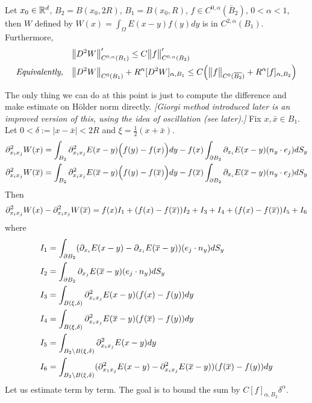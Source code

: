 \documentclass[12pt,a4paper]{article}
\newenvironment{proof}
{\begin{changemargin}{0.5cm}{0.5cm} 
	}%
	{\end{changemargin}
}
\newenvironment{p}
{\begin{proof} 
	}%
	{\end{proof}
}
\begin{document}
 Let $x_0\in \mathbb{R}^d$, $B_2 = B(x_0, 2R)$, $B_1=B(x_0, R)$, $f\in C^{0, \alpha}(\bar{B}_2)$, $0<\alpha<1$, then $W$ defined by $W(x) = \int_{\Omega} E(x-y) f(y)dy$ is in $C^{2,\alpha}(B_1)$. Furthermore,
\begin{align*}
&\bigl\lVert D^2 W\bigr\rVert_{C^{0, \alpha}(B_1)}' \leq C \bigl\lVert f\bigr\rVert_{C^{0, \alpha}(B_2)}' \\
\textit{Equivalently,} \quad &\bigl\lVert D^2 W\bigr\rVert_{C^0(B_1)} +R^{\alpha}[D^2 W]_{\alpha, B_1} \leq C \Big( \bigl\lVert f\bigr\rVert_{C^0(\overline{B_2})} + R^{\alpha}[f]_{\alpha, B_2} \Big)
\end{align*}
\begin{p}
\pf The only thing we can do at this point is just to compute the difference and make estimate on H\"older norm directly. \emph{[Giorgi method introduced later is an improved version of this, using the idea of oscillation (see later).]}
Fix $x, \bar{x} \in B_1$. Let $0<\delta := |x-\bar{x}|< 2R$ and $\xi = \frac{1}{2}(x+\bar{x})$.
\begin{align*}
&\partial^2_{x_i x_j} W(x) = \int_{B_2} \partial_{x_i x_j}^2 E(x-y) \Big(f(y)- f(x)\Big) dy - f(x) \int_{\partial B_2} \partial_{x_i} E(x-y) (n_y \cdot e_j) dS_y \\
&\partial_{x_i x_j}^2 W(\overline{x}) = \int_{B_2} \partial_{x_i x_j}^2 E(\overline{x}-y) \Big(f(y)- f(\overline{x})\Big) dy - f(\overline{x}) \int_{\partial B_2} \partial_{x_i} E(\overline{x}-y) (n_y \cdot e_j) dS_y
\end{align*}
Then
\begin{align*}
\partial_{x_i x_j}^2 W(x) - \partial_{x_i x_j}^2 W(\overline{x}) = f(x)I_1 + (f(x)- f(\overline{x}))I_2 + I_3 + I_4 + (f(x)-f(\overline{x}))I_5 + I_6 
\end{align*}
where
\begin{align*}
&I_1 = \int_{\partial B_2} (\partial_{x_i} E(x-y) - \partial_{x_i}E(\overline{x}-y))(e_j \cdot n_y) dS_y \\
&I_2 = \int_{\partial B_2} \partial_{x_j} E(\overline{x} -y) (e_j \cdot n_y) dS_y \\
&I_3 = \int_{B(\xi, \delta)} \partial^2_{x_i x_j} E(x-y) (f(x)-f(y)) dy \\
&I_4 = \int_{B(\xi, \delta)} \partial_{x_i x_j}^2 E(\overline{x}-y) (f(\overline{x}) - f(y))dy \\
&I_5 = \int_{B_2 \backslash B(\xi, \delta)} \partial_{x_i x_j}^2 E(x-y) dy \\
&I_6 = \int_{B_2 \backslash B(\xi, \delta)} (\partial_{x_1 x_j}^2 E(x-y) - \partial^2_{x_i x_j}E(\overline{x}-y) ) (f(\overline{x}) - f(y))dy
\end{align*}
Let us estimate term by term. The goal is to bound the sum by $C [f]_{\alpha, B_2}\delta^{\alpha}$.

\end{p}
\end{document}
